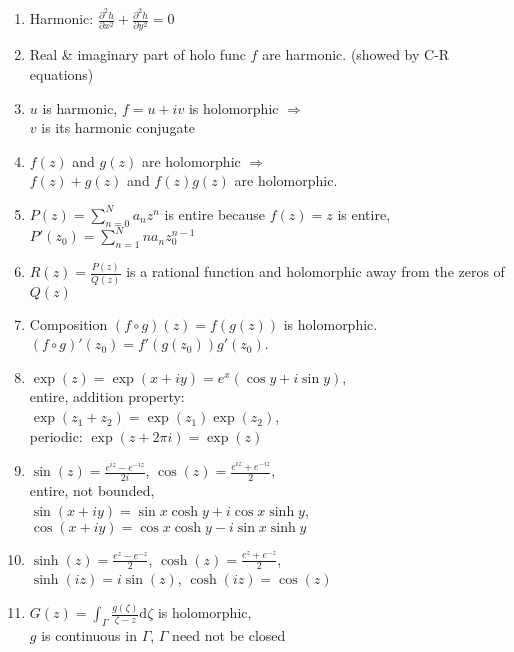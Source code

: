 \documentclass[11pt,a4paper]{article}
\begin{document}
\begin{multicols}{2}
\begin{enumerate}[resume]
\item Harmonic: $\frac{\partial^2 h}{\partial x^2} + \frac{\partial^2 h}{\partial y^2} = 0$

\item Real \& imaginary part of holo func $f$ are harmonic. (showed by C-R equations)

\item $u$ is harmonic, $f=u+iv$ is holomorphic $\Rightarrow$ \\$v$ is its harmonic conjugate

\item $f(z)$ and $g(z)$ are holomorphic $\Rightarrow$ \\$f(z) + g(z)$ and $f(z)g(z)$ are holomorphic. 

\item $P(z) = \sum_{n=0}^{N} a_n z^n$ is entire because $f(z) = z$ is entire, \\$P'(z_0) = \sum_{n=1}^{N} n a_n z_0^{n-1}$

\item $R(z) = \frac{P(z)}{Q(z)}$ is a rational function and holomorphic away from the zeros of $Q(z)$

\item Composition $(f \circ g)(z) = f(g(z))$ is holomorphic. $(f \circ g)' (z_0) = f'(g(z_0)) g'(z_0)$. 

\item $\exp (z) = \exp (x+iy) = e^x (\cos y + i \sin y)$, \\entire, addition property: \\$\exp (z_1 + z_2) = \exp (z_1) \exp (z_2)$, \\periodic: $\exp (z + 2 \pi i) = \exp (z)$

\item $\sin (z) = \frac{e^{iz}-e^{-iz}}{2i}$, $\cos (z) = \frac{e^{iz}+e^{-iz}}{2}$, \\entire, not bounded, \\$\sin (x+iy) = \sin x \cosh y + i \cos x \sinh y$, \\$\cos (x+iy) = \cos x \cosh y - i \sin x \sinh y$

\item $\sinh (z) = \frac{e^z - e^{-z}}{2}$, $\cosh (z) = \frac{e^z + e^{-z}}{2}$, \\$\sinh (iz) = i \sin (z)$, $\cosh (iz) = \cos (z)$

\item $G(z) = \int_{\Gamma} \frac{g(\zeta)}{\zeta - z} \mathrm{d}\zeta$ is holomorphic, \\$g$ is continuous in $\Gamma$, $\Gamma$ need not be closed


\end{enumerate}
\end{multicols}
\end{document}
